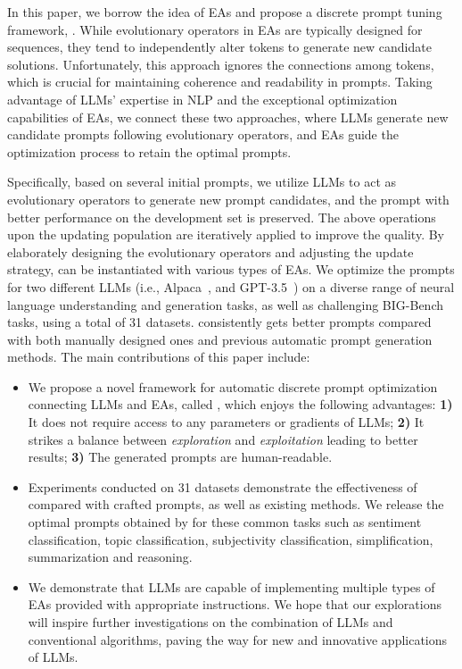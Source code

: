 In this paper, we borrow the idea of EAs and propose a discrete prompt tuning framework, \modelname. While evolutionary operators in EAs are typically designed for sequences, they tend to independently alter tokens to generate new candidate solutions. Unfortunately, this approach ignores the connections among tokens, which is crucial for maintaining coherence and readability in prompts. Taking advantage of LLMs' expertise in NLP and the exceptional optimization capabilities of EAs, we connect these two approaches, where LLMs generate new candidate prompts following evolutionary operators, and EAs guide the optimization process to retain the optimal prompts. 

Specifically, based on several initial prompts, we utilize LLMs to act as evolutionary operators to generate new prompt candidates, and the prompt with better performance on the development set is preserved.
The above operations upon the updating population are iteratively applied to improve the quality. By elaborately designing the evolutionary operators and adjusting the update strategy, \modelname can be instantiated with various types of EAs. We optimize the prompts for two different LLMs (i.e., Alpaca~\citep{alpaca}, and GPT-3.5~\citep{brown2020language}) on a diverse range of neural language understanding and generation tasks, as well as challenging BIG-Bench tasks, using a total of 31 datasets. \modelname consistently gets better prompts compared with both manually designed ones and previous automatic prompt generation methods. 
The main contributions of this paper include:
\begin{itemize}[leftmargin=*]
    \item We propose a novel framework for automatic discrete prompt optimization connecting LLMs and EAs, called \modelname, which enjoys the following advantages: 
    \textbf{1)} It does not require access to any parameters or gradients of LLMs; \textbf{2)} It strikes a balance between \emph{exploration} and \emph{exploitation} leading to better results; \textbf{3)} The generated prompts are human-readable.
    \item Experiments conducted on 31 datasets demonstrate the effectiveness of \modelname compared with crafted prompts, as well as existing methods. We release the optimal prompts obtained by \modelname for these common tasks such as sentiment classification, topic classification, subjectivity classification, simplification, summarization and reasoning.
    \item We demonstrate that LLMs are capable of implementing multiple types of EAs provided with appropriate instructions. We hope that our explorations will inspire further investigations on the combination of LLMs and conventional algorithms, paving the way for new and innovative applications of LLMs.
\end{itemize}


